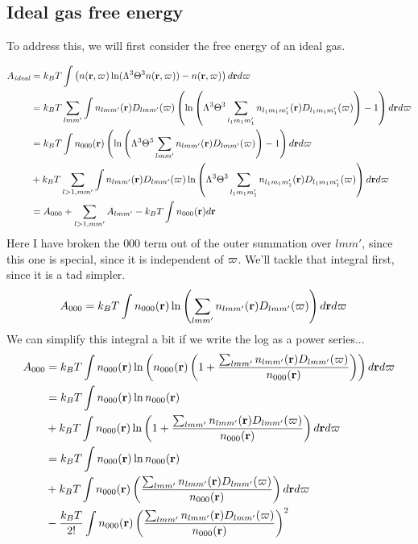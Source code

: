 \documentclass[letterpaper,twocolumn,amsmath,amssymb,pre]{revtex4-1}
\begin{document}
\subsection{Ideal gas free energy}
To address this, we will
first consider the free energy of an ideal gas.
\begin{widetext}
\begin{align}
  A_{\textit{ideal}} &=
  k_BT \int
  \left(n(\mathbf{r},\mathbf{\varpi})\ln(\Lambda^3\Theta^3 n(\mathbf{r},\mathbf{\varpi})) - n(\mathbf{r},\mathbf{\varpi})
  \right) d\mathbf{r} d\mathbf{\varpi} \label{eq:Aideal}
  \\
  &=
  k_BT \sum_{lmm'} \int
  n_{lmm'}(\mathbf{r})D_{lmm'}(\mathbf{\varpi})\left(
  \ln\left(\Lambda^3\Theta^3 \sum_{l_1m_1m'_1} n_{l_1m_1m'_1}(\mathbf{r})D_{l_1m_1m'_1}(\mathbf{\varpi})\right) - 1
  \right) d\mathbf{r} d\mathbf{\varpi}
  \\
  &=
  k_BT \int n_{000}(\mathbf{r})
  \left(\ln\left(\Lambda^3\Theta^3 \sum_{lmm'} n_{lmm'}(\mathbf{r})D_{lmm'}(\mathbf{\varpi})\right) - 1
  \right) d\mathbf{r} d\mathbf{\varpi}
  \\&+
  k_BT \sum_{l>1,mm'} \int
  n_{lmm'}(\mathbf{r})D_{lmm'}(\mathbf{\varpi})
  \ln\left(\Lambda^3\Theta^3 \sum_{l_1m_1m'_1} n_{l_1m_1m'_1}(\mathbf{r})D_{l_1m_1m'_1}(\mathbf{\varpi})\right)
  d\mathbf{r} d\mathbf{\varpi}
  \\
  &= A_{000} + \sum_{l>1,mm'} A_{lmm'} - k_BT\int n_{000}(\mathbf{r})d\mathbf{r}
\end{align}
Here I have broken the $000$ term out of the outer summation over
$lmm'$, since this one is special, since it is independent of $\mathbf{\varpi}$.
We'll tackle that integral first, since it is a tad simpler.
\begin{align}
  A_{000} &= k_BT\int
  n_{000}(\mathbf{r})\ln\left(
  \sum_{lmm'} n_{lmm'}(\mathbf{r})D_{lmm'}(\mathbf{\varpi})
  \right)
  d\mathbf{r} d\mathbf{\varpi}
\end{align}
We can simplify this integral a bit if we write the log as a power
series...
\begin{align}
  A_{000}
  &= k_BT\int
  n_{000}(\rr)\ln\left(
  n_{000}(\rr)\left(1 + \frac{\sum_{lmm'} n_{lmm'}(\rr)D_{lmm'}(\rot)}{n_{000}(\rr)}\right)
  \right)
  d\rr d\rot
  \\
  &= k_BT\int
  n_{000}(\rr)\ln n_{000}(\rr)
  \\&+k_BT\int
  n_{000}(\rr)\ln\left(1 + \frac{\sum_{lmm'} n_{lmm'}(\rr)D_{lmm'}(\rot)}{n_{000}(\rr)}\right)
  d\rr d\rot
  \\
  &= k_BT\int
  n_{000}(\rr)\ln n_{000}(\rr)
  \\&+k_BT\int
  n_{000}(\rr)\left(\frac{\sum_{lmm'} n_{lmm'}(\rr)D_{lmm'}(\rot)}{n_{000}(\rr)}\right)
  d\rr d\rot
  \\&-\frac{k_BT}{2!}\int
  n_{000}(\rr)\left(\frac{\sum_{lmm'} n_{lmm'}(\rr)D_{lmm'}(\rot)}{n_{000}(\rr)}\right)^2

\end{align}
\end{widetext}
\end{document}
